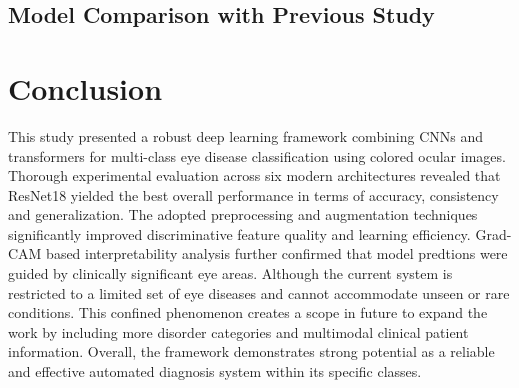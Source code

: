 \documentclass[conference,9pt]{IEEEtran}
\begin{document}
\subsection{Model Comparison with Previous Study}
\begin{table}[H]
\centering
\caption{Comparison with Previous Studies}
\label{tab:comparison_previous_works}
\renewcommand{\arraystretch}{1.15}
\footnotesize

\end{table}





   
\section{\textbf{Conclusion }}
This study presented a robust deep learning framework combining CNNs and transformers for multi-class eye disease classification using colored ocular images. Thorough experimental evaluation across six modern architectures revealed that ResNet18 yielded the best overall performance in terms of accuracy, consistency and generalization. The adopted preprocessing and augmentation techniques significantly improved discriminative feature quality and learning efficiency. Grad-CAM based interpretability analysis further confirmed that model predtions were guided by clinically significant eye areas. Although the current system is restricted to a limited set of eye diseases and cannot accommodate unseen or rare conditions. This confined phenomenon creates a scope in future to expand the work by including more disorder categories and multimodal clinical patient information. Overall, the framework demonstrates strong potential as a reliable and effective automated diagnosis system within its specific classes.
\end{document}
